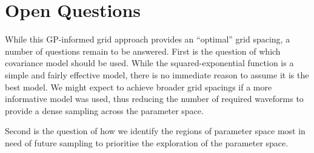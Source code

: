 \documentclass[a4paper]{article}
\begin{document}

\section{Open Questions}
\label{sec:open-questions}

While this GP-informed grid approach provides an ``optimal'' grid
spacing, a number of questions remain to be answered. First is the
question of which covariance model should be used. While the
squared-exponential function is a simple and fairly effective model,
there is no immediate reason to assume it is the best model. We might
expect to achieve broader grid spacings if a more informative model
was used, thus reducing the number of required waveforms to provide a
dense sampling across the parameter space.

Second is the question of how we identify the regions of parameter
space most in need of future sampling to prioritise the exploration of
the parameter space. 
\end{document}
